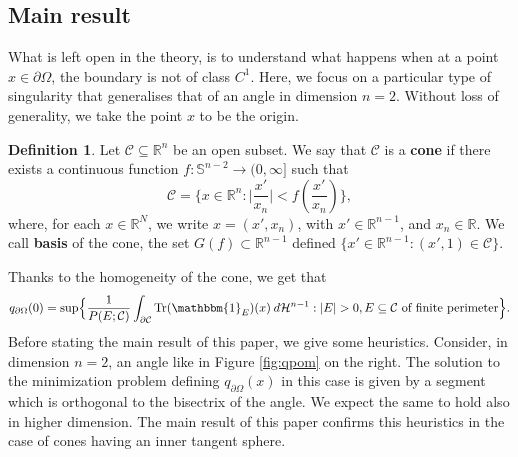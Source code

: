 \documentclass[artcle, 11pt, reqno]{amsart}
\numberwithin{equation}{section}
\newcommand{\R}{\mathbb{R}}
\newcommand{\Hd}{\mathcal{H}}
\newcommand{\pom}{{\partial \Omega}}
\newcommand{\ind}{\mathbbm{1}}
\newcommand{\C}{\mathcal{C}}
\newcommand{\dd}{\: d}
\DeclareMathOperator{\Tr}{Tr}
\theoremstyle{plain}
\theoremstyle{definition}
\newtheorem{definition}[theorem]{Definition}
\theoremstyle{remark}
\begin{document}
	
	
	
	
	
	
	
	
	
	\subsection{Main result}
	
	What is left open in the theory, is to understand what happens when at a point $x\in\partial\Omega$, the boundary is not of class $C^1$. Here, we focus on a particular type of singularity that generalises that of an angle in dimension $n=2$. Without loss of generality, we take the point $x$ to be the origin.
	
	\begin{definition} \label{def:cone}
		Let $\C\subseteq \R^n$ be an open subset. We say that $\C$ is a \textbf{cone} if there exists a continuous function $f: \mathbb{S}^{n-2} \rightarrow (0, \infty]$ such that
		\[
		\C = \biggl\{ x \in \R^n : \Big| \frac{x'}{x_n} \Big|<  f \left( \frac{x'}{x_n} \right) \biggr\},
		\]
		where, for each $x\in\R^N$, we write \( x = (x', x_n)\), with $x'\in\R^{n-1}$, and $x_n\in\R$.
		We call \textbf{basis} of the cone, the set $G(f) \subset \R^{n-1}$ defined $\{x'\in\R^{n-1} : (x',1)\in\C\}$.
	\end{definition}
	Thanks to the homogeneity of the cone, we get that
	\[
	q_\pom(0) = \sup \Bigl\{ \frac{1}{P(E;\C)} \int_{\partial \C} \Tr(\ind_E)(x) \dd \Hd^{n-1} : |E| > 0, E \subseteq \C \text{ of finite perimeter} \Bigr\}.
	\]
	Before stating the main result of this paper, we give some heuristics. Consider, in dimension $n=2$, an angle like in Figure \ref{fig:qpom} on the right. The solution to the minimization problem defining $q_\pom(x)$ in this case is given by a segment which is orthogonal to the bisectrix of the angle. We expect the same to hold also in higher dimension. The main result of this paper confirms this heuristics in the case of cones having an inner tangent sphere.
	
\end{document}
